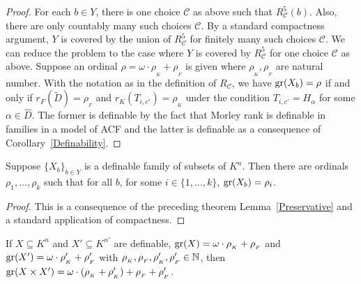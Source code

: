 \begin{proof}
For each $b \in Y$, there is one choice  $\mathscr{C}$ as above such that $R^5_{\mathscr{C}}(b)$.  Also, there are only countably many such choices $\mathscr{C}$. By a standard compactness argument,  $Y$ is covered by the union of $R^5_{\mathscr{C}}$ for finitely many such choices $\mathscr{C}$. We can reduce the problem to the case where $Y$ is covered by $R^5_{\mathscr{C}}$ for one choice $\mathscr{C}$ as above. 
Suppose an ordinal $\rho = \omega\cdot \rho_{{}_K} + \rho_{{}_F}$ is given where $\rho_{{}_K}, \rho_{{}_F}$ are natural number. With the notation as in the definition of $R_{\mathscr{C}}$, we have $\mathrm{gr}(X_b) = \rho$ if and only if $r_F(\widetilde{D}) = \rho_{{}_F} $ and $r_K(T_{i,c'}) = \rho_{{}_K}$ under the condition $T_{i,c'} = H_\alpha $ for some $\alpha \in \hat{D}$. The former is definable by the fact that Morley rank is definable in families in a model of ACF and the latter is definable as a consequence of Corollary~\ref{Definability}.
\end{proof}


\begin{cor}
Suppose $ \{ X_b\}_{b \in Y}$ is a definable family of subsets of $K^n$. Then there are ordinals $\rho_1, \ldots, \rho_k$ such that for all \(b\), for some $i \in \{1, \ldots, k\}$, $\mathrm{gr}(X_b) =\rho_i$.
\end{cor}

\begin{proof}
This is a consequence of the preceding theorem Lemma~\ref{Preservative} and a standard application of compactness.
\end{proof}





\begin{prop}
If $X \subseteq K^n$ and $ X'\subseteq K^{n'}$ are definable, $\mathrm{gr}(X) = \omega\cdot \rho_{{}_K} + \rho_{{}_F}$ and $  \mathrm{gr}(X') = \omega\cdot \rho'_{{}_K} + \rho'_{{}_F}$ with $\rho_{{}_K}, \rho_{{}_F}, \rho'_{{}_K}, \rho'_{{}_F} \in \mathbb{N}$,  then  $\mathrm{gr}(X\times X') = \omega\cdot (\rho_{{}_K}+\rho'_{{}_K}) +\rho_{{}_F}+\rho'_{{}_F}$.
\end{prop}

